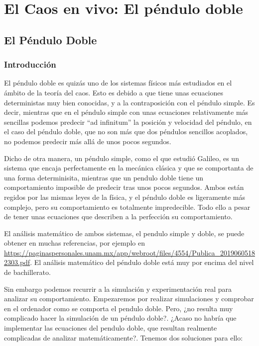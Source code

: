 \documentclass[
  11pt,
  a4paper,
  DIV=11,
  numbers=noendperiod]{scrreprt}
\begin{document}
\part{El Caos en vivo: El péndulo doble}

\chapter{El Péndulo Doble}\label{el-puxe9ndulo-doble}

\section{Introducción}\label{introducciuxf3n-3}

El péndulo doble es quizás uno de los sistemas físicos más estudiados en
el ámbito de la teoría del caos. Esto es debido a que tiene unas
ecuaciones deterministas muy bien conocidas, y a la contraposición con
el péndulo simple. Es decir, mientras que en el péndulo simple con unas
ecuaciones relativamente más sencillas podemos predecir ``ad infinitum''
la posición y velocidad del péndulo, en el caso del péndulo doble, que
no son más que dos péndulos sencillos acoplados, no podemos predecir más
allá de unos pocos segundos.

Dicho de otra manera, un péndulo simple, como el que estudió Galileo, es
un sistema que encaja perfectamente en la mecánica clásica y que se
comportanta de una forma determinisita, mientras que un pendulo doble
tiene un comportamiento imposible de predecir tras unos pocos segundos.
Ambos están regidos por las mismas leyes de la física, y el péndulo
doble es ligeramente más complejo, pero su comportamiento es totalmente
impredecible. Todo ello a pesar de tener unas ecuaciones que describen a
la perfección su comportamiento.

El análisis matemático de ambos sistemas, el pendulo simple y doble, se
puede obtener en muchas referencias, por ejemplo en
\url{https://paginaspersonales.unam.mx/app/webroot/files/4554/Publica_20190605182303.pdf}.
El análisis matemático del péndulo doble está muy por encima del nivel
de bachillerato.

Sin embargo podemos recurrir a la simulación y experimentación real para
analizar su comportamiento. Empezaremos por realizar simulaciones y
comprobar en el ordenador como se comporta el pendulo doble. Pero, ¿no
resulta muy complicado hacer la simulación de un péndulo doble?. ¿Acaso
no habría que implementar las ecuaciones del pendulo doble, que resultan
realmente complicadas de analizar matemáticamente?. Tenemos dos
soluciones para ello:
\end{document}

